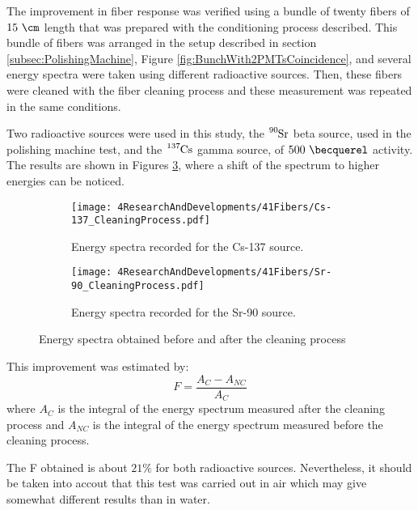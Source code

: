 The improvement in fiber response was verified using a bundle of twenty fibers of $15~\cm$ length  that was prepared with the conditioning process described. This bundle of fibers was arranged in the setup described in section \ref{subsec:PolishingMachine}, Figure \ref{fig:BunchWith2PMTsCoincidence}, and several energy spectra were taken using different radioactive sources. Then, these fibers were cleaned with the fiber cleaning process and these measurement was repeated in the same conditions.

Two radioactive sources were used in this study, the $\ce{^{90}Sr}$ beta source, used in the polishing machine test, and the $\ce{^{137}Cs}$ gamma source, of $500~\becquerel$ activity. The results are shown in Figures \ref{fig:ResultsOfCleaningProcess}, where a shift of the spectrum to higher energies can be noticed. 

\begin{figure}
\centering
    \begin{subfigure}[b]{0.76\textwidth}
    \centering
    \texttt{[image: 4ResearchAndDevelopments/41Fibers/Cs-137\_CleaningProcess.pdf]}  
    \caption{Energy spectra recorded for the Cs-137 source.\label{subfig:EnergySpectrumCo60CleaningTest}}
    \end{subfigure}
    \hfill
    \begin{subfigure}[b]{0.76\textwidth}
    \centering
    \texttt{[image: 4ResearchAndDevelopments/41Fibers/Sr-90\_CleaningProcess.pdf]}  
    \caption{Energy spectra recorded for the Sr-90 source.\label{subfig:EnergySpectrumSr90CleaningTest}}
    \end{subfigure}
 \caption{Energy spectra obtained before and after the cleaning process}
 \label{fig:ResultsOfCleaningProcess}
\end{figure}

This improvement was estimated by: 
\begin{equation}
F=\frac{A_{C}-A_{NC}}{A_{C}}
\label{eq:RelativeImprovement}
\end{equation}
where $A_{C}$ is the integral of the energy spectrum measured after the cleaning process and $A_{NC}$ is the integral of the energy spectrum measured before the cleaning process.

The F obtained is about $21\%$ for both radioactive sources. Nevertheless, it should be taken into accout that this test was carried out in air which may give somewhat different results than in water.

